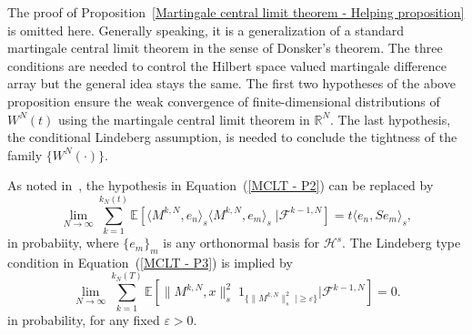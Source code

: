 The proof of Proposition~\ref{Martingale central limit theorem - Helping proposition} is omitted here. Generally speaking, it is a generalization of a standard martingale central limit theorem in the sense of Donsker's theorem. The three conditions are needed to control the Hilbert space valued martingale difference array but the general idea stays the same. The first two hypotheses of the above proposition ensure the weak convergence of finite-dimensional distributions of $ W^{N}(t) $ using the martingale central limit theorem in $ \mathbb{R}^N $. The last hypothesis, the conditional Lindeberg assumption, is needed to conclude the tightness of the family $ \{ W^{N}(\cdot) \}  $.

\begin{rem}
 As noted in~\autocite{ChenWhite1998}, the hypothesis in Equation~(\ref{MCLT - P2}) can be replaced by
 \begin{equation*}
  \lim_{N \to \infty} \sum_{k=1}^{k_{N}(t)} \mathbb{E} \left[ \langle  M^{k,N} , e_n \rangle_{s} \langle  M^{k,N} , e_m \rangle_{s} \; | \mathcal{F}^{k-1,N} \right] = t \langle e_n , S e_m \rangle_{s}, 
 \end{equation*}
 in probabiity, where $ \{ e_m \}_{m} $ is any orthonormal basis for $ \mathcal{H}^s $. The Lindeberg type condition in Equation~(\ref{MCLT - P3}) is implied by
 \begin{equation*}
  \lim_{N \to \infty} \sum_{k=1}^{k_{N}(T)} \mathbb{E} \left[ \| M^{k,N} , x \|_{s}^{2} \;  1_{\{ \| M^{k,N} \|_{s}^{2} \; | \geq \varepsilon \}} | \mathcal{F}^{k-1,N} \right] = 0. 
 \end{equation*}
 in probability, for any fixed $ \varepsilon > 0 $.

\end{rem}

